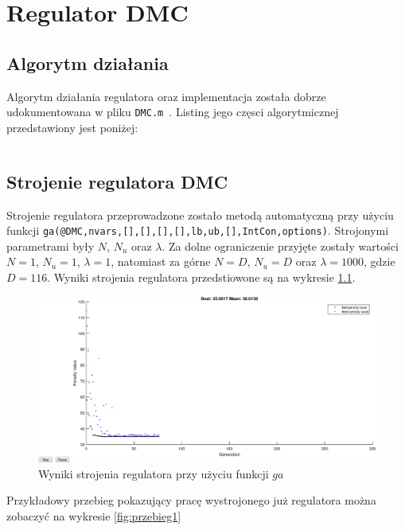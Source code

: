 \chapter{Regulator DMC}
\label{zad4}


\section{Algorytm działania}
Algorytm działania regulatora oraz implementacja została dobrze udokumentowana w pliku \verb+DMC.m +. Listing jego częsci algorytmicznej przedstawiony jest poniżej:
\begin{lstlisting}[style=custommatlab,frame=single,label={zad4_sim_lst},caption={Implementacja regulatora DMC},captionpos=b]

\end{lstlisting}


\section{Strojenie regulatora DMC}


Strojenie regulatora przeprowadzone zostało metodą automatyczną przy użyciu\\ funkcji \verb+ga(@DMC,nvars,[],[],[],[],lb,ub,[],IntCon,options)+. Strojonymi parametrami były $N$, $N_u$ oraz $\lambda$. Za dolne ograniczenie przyjęte zostały wartości $N=1$, $N_u = 1$, $\lambda = 1$, natomiast za górne $N=D$, $N_u = D$ oraz $\lambda = 1000$, gdzie $D = 116$. Wyniki strojenia regulatora przedstiowone są na wykresie \ref{fig:strojenie}.

\begin{figure}[h!]
	\centering
	\includegraphics[scale=0.5]{Rys/strojenie.eps}
	\caption{Wyniki strojenia regulatora przy użyciu funkcji $ga$}
	\label{fig:strojenie}
\end{figure}

Przykładowy przebieg pokazujący pracę wystrojonego już regulatora można zobaczyć na wykresie \ref{fig:przebieg1}

